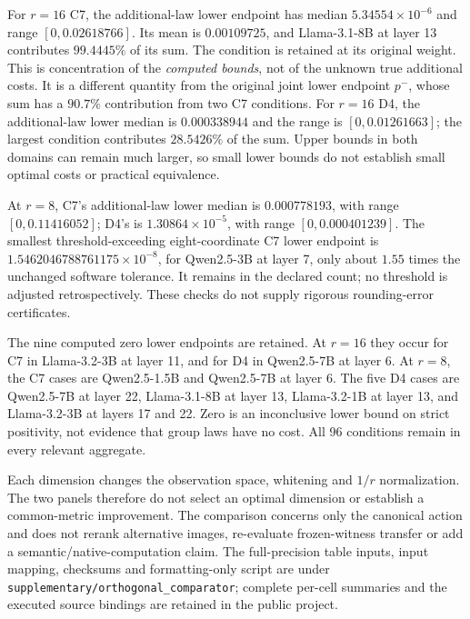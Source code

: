 For $r=16$ C7, the additional-law lower endpoint has median $5.34554\times10^{-6}$ and range $[0,0.02618766]$. Its mean is $0.00109725$, and Llama-3.1-8B at layer 13 contributes $99.4445\%$ of its sum. The condition is retained at its original weight. This is concentration of the \emph{computed bounds}, not of the unknown true additional costs. It is a different quantity from the original joint lower endpoint $p^-$, whose sum has a $90.7\%$ contribution from two C7 conditions. For $r=16$ D4, the additional-law lower median is $0.000338944$ and the range is $[0,0.01261663]$; the largest condition contributes $28.5426\%$ of the sum. Upper bounds in both domains can remain much larger, so small lower bounds do not establish small optimal costs or practical equivalence.

At $r=8$, C7's additional-law lower median is $0.000778193$, with range $[0,0.11416052]$; D4's is $1.30864\times10^{-5}$, with range $[0,0.000401239]$. The smallest threshold-exceeding eight-coordinate C7 lower endpoint is $1.5462046788761175\times10^{-8}$, for Qwen2.5-3B at layer 7, only about $1.55$ times the unchanged software tolerance. It remains in the declared count; no threshold is adjusted retrospectively. These checks do not supply rigorous rounding-error certificates.

The nine computed zero lower endpoints are retained. At $r=16$ they occur for C7 in Llama-3.2-3B at layer 11, and for D4 in Qwen2.5-7B at layer 6. At $r=8$, the C7 cases are Qwen2.5-1.5B and Qwen2.5-7B at layer 6. The five D4 cases are Qwen2.5-7B at layer 22, Llama-3.1-8B at layer 13, Llama-3.2-1B at layer 13, and Llama-3.2-3B at layers 17 and 22. Zero is an inconclusive lower bound on strict positivity, not evidence that group laws have no cost. All 96 conditions remain in every relevant aggregate.

Each dimension changes the observation space, whitening and $1/r$ normalization. The two panels therefore do not select an optimal dimension or establish a common-metric improvement. The comparison concerns only the canonical action and does not rerank alternative images, re-evaluate frozen-witness transfer or add a semantic/native-computation claim. The full-precision table inputs, input mapping, checksums and formatting-only script are under \texttt{supplementary/orthogonal\_comparator}; complete per-cell summaries and the executed source bindings are retained in the public project.


